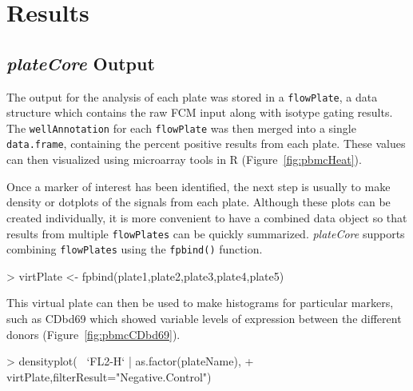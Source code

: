 \documentclass[12pt]{article}
\newcommand{\Rfunction}[1]{{\texttt{#1()}}}
\newcommand{\Robject}[1]{{\texttt{#1}}}
\newcommand{\Rpackage}[1]{{\textit{#1}}}
\begin{document}
\clearpage
\section*{Results}
\subsection*{\Rpackage{plateCore} Output}

The output for the analysis of each plate was stored in a \Robject{flowPlate}, a data structure which contains the raw
FCM input along with isotype gating results. The \Robject{wellAnnotation} for each \Robject{flowPlate} was then merged
into a single \Robject{data.frame}, containing the percent positive results from each plate. These values can then visualized
using microarray tools in R (Figure~\ref{fig:pbmcHeat}). 

Once a marker of interest has been identified, the next step is usually to make density or dotplots of the signals from each
plate. Although these plots can be created individually, it is more convenient to have a combined data object so that results 
from multiple \Robject{flowPlates} can be quickly summarized. \Rpackage{plateCore} supports combining \Robject{flowPlates} using
the \Rfunction{fpbind} function. 
\begin{Schunk}
\begin{Sinput}
> virtPlate <- fpbind(plate1,plate2,plate3,plate4,plate5)
\end{Sinput}
\end{Schunk}
This virtual plate can then be used to make histograms for particular markers, such as CDbd69 which showed variable levels of
expression between the different donors (Figure~\ref{fig:pbmcCDbd69}). 
\begin{Schunk}
\begin{Sinput}
> densityplot(~ `FL2-H` | as.factor(plateName),
+ 	virtPlate,filterResult="Negative.Control")
\end{Sinput}
\end{Schunk}
\end{document}
